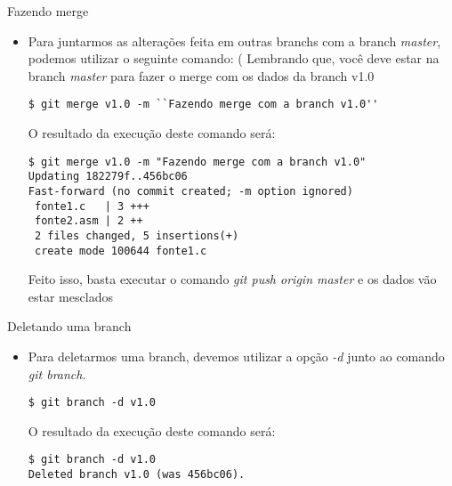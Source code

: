 \begin{slide}[method=direct]{Fazendo merge}
	\begin{itemize}
	\item{Para juntarmos as alterações feita em outras branchs com a branch \textit{master}, podemos utilizar o seguinte comando: ( Lembrando que, você deve estar na branch \textit{master} para fazer o merge com os dados da branch v1.0
	\begin{lstlisting}[style=Bash,basicstyle=\tiny]
$ git merge v1.0 -m ``Fazendo merge com a branch v1.0''
	\end{lstlisting}
	O resultado da execução deste comando será:
	\begin{lstlisting}[style=Bash,basicstyle=\tiny]
$ git merge v1.0 -m "Fazendo merge com a branch v1.0"
Updating 182279f..456bc06
Fast-forward (no commit created; -m option ignored)
 fonte1.c   | 3 +++
 fonte2.asm | 2 ++
 2 files changed, 5 insertions(+)
 create mode 100644 fonte1.c
 	\end{lstlisting}
 	Feito isso, basta executar o comando \textit{git push origin master} e os dados vão estar mesclados
	}
	\end{itemize}
\end{slide}

\begin{slide}[method=direct]{Deletando uma branch}
	\begin{itemize}
	\item{Para deletarmos uma branch, devemos utilizar a opção \textit{-d} junto ao comando \textit{git branch}.
	\begin{lstlisting}[style=Bash]
$ git branch -d v1.0
	\end{lstlisting}
	O resultado da execução deste comando será:
	\begin{lstlisting}[style=Bash]
$ git branch -d v1.0
Deleted branch v1.0 (was 456bc06).
	\end{lstlisting}
	}
	\end{itemize}
\end{slide}